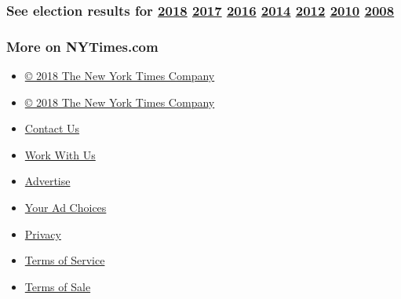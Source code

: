 \hypertarget{see-election-results-for-2018-2017-2016-2014-2012-2010-2008}{%
\subsubsection{\texorpdfstring{See election results for
\href{https://www.nytimes3xbfgragh.onion/interactive/2018/us/elections/calendar-primary-results.html}{2018}
\href{https://www.nytimes3xbfgragh.onion/interactive/2017/us/elections/election-calendar.html}{2017}
\href{https://www.nytimes3xbfgragh.onion/elections/results/president}{2016}
\href{https://www.nytimes3xbfgragh.onion/elections/2014/results/senate}{2014}
\href{https://www.nytimes3xbfgragh.onion/elections/2012/results/president.html}{2012}
\href{https://www.nytimes3xbfgragh.onion/elections/2010/results/senate.html}{2010}
\href{https://www.nytimes3xbfgragh.onion/elections/2008/results/president/map.html}{2008}}{See election results for 2018 2017 2016 2014 2012 2010 2008}}\label{see-election-results-for-2018-2017-2016-2014-2012-2010-2008}}

\hypertarget{more-on-nytimescom}{%
\subsubsection{More on NYTimes.com}\label{more-on-nytimescom}}

\begin{itemize}
\tightlist
\item
  \href{http://www.nytco.com}{© 2018 The New York Times Company}
\end{itemize}

\begin{itemize}
\tightlist
\item
  \href{http://www.nytco.com}{© 2018 The New York Times Company}
\item
  \href{http://www.nytimes3xbfgragh.onion/ref/membercenter/help/infoservdirectory.html}{Contact
  Us}
\item
  \href{http://www.nytco.com/careers}{Work With Us}
\item
  \href{http://www.nytimes.whsites.net/mediakit}{Advertise}
\item
  \href{http://www.nytimes3xbfgragh.onion/content/help/rights/privacy/policy/privacy-policy.html\#pp}{Your
  Ad Choices}
\item
  \href{http://www.nytimes3xbfgragh.onion/privacy}{Privacy}
\item
  \href{http://www.nytimes3xbfgragh.onion/ref/membercenter/help/agree.html}{Terms
  of Service}
\item
  \href{http://www.nytimes3xbfgragh.onion/content/help/rights/sale/terms-of-sale.html}{Terms
  of Sale}
\end{itemize}

